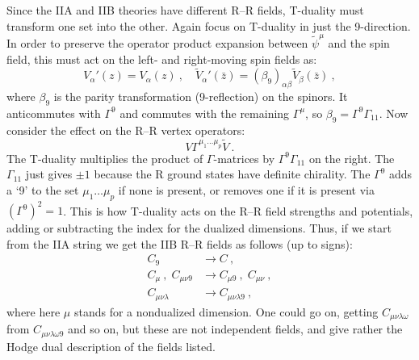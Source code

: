 Since the IIA and IIB theories have different R--R fields, T-duality must transform one set into the other. Again focus on T-duality in just the 9-direction. In order to preserve the operator product expansion between $\tilde{\psi}^\mu$ and the spin field, this must act on the left- and right-moving spin fields as:
\begin{equation}
	V_\alpha'(z) = V_\alpha(z) \:, \quad \tilde{V}_\alpha'(\bar{z}) = (\beta_9)_{\alpha\beta}\tilde{V}_\beta(\bar{z}) \:, \label{13.1.3}
\end{equation}
where $\beta_9$ is the parity transformation (9-reflection) on the spinors. It anticommutes with $\Gamma^9$ and commutes with the remaining $\Gamma^\mu$, so $\beta_9 = \Gamma^9\Gamma_{11}$.
\noindent Now consider the effect on the R--R vertex operators:
\begin{equation}
	V\Gamma^{\mu_1\dots\mu_p}\tilde{V} \:. \label{13.1.4}
\end{equation}
The T-duality multiplies the product of $\Gamma$-matrices by $\Gamma^9\Gamma_{11}$ on the right. The $\Gamma_{11}$ just gives $\pm 1$ because the R ground states have definite chirality. The $\Gamma^9$ adds a `9' to the set $\mu_1\dots\mu_p$ if none is present, or removes one if it is present via $(\Gamma^9)^2 = 1$. This is how T-duality acts on the R--R field strengths and potentials, adding or subtracting the index for the dualized dimensions. Thus, if we start from the IIA string we get the IIB R--R fields as follows (up to signs):
\begin{subequations} \label{13.1.5}
	\begin{align}
		C_9 &\longrightarrow C \:, \label{13.1.5a} \\
		C_\mu \:, \; C_{\mu\nu 9} &\longrightarrow C_{\mu 9} \:, \; C_{\mu\nu} \:, \label{13.1.5b} \\
		C_{\mu\nu\lambda} &\longrightarrow C_{\mu\nu\lambda 9} \:, \label{13.1.5c}
	\end{align}
\end{subequations}
where here $\mu$ stands for a nondualized dimension. One could go on, getting $C_{\mu\nu\lambda\omega}$ from $C_{\mu\nu\lambda\omega 9}$ and so on, but these are not independent fields, and give rather the Hodge dual description of the fields listed.
